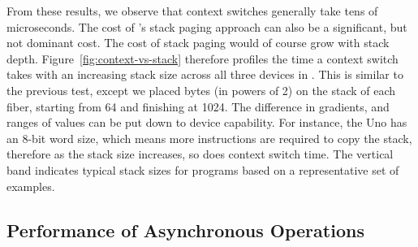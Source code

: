 From these results, we observe that context switches generally take tens of microseconds. The cost of \CON's stack paging approach can also be a significant, but not dominant cost. The cost of stack paging would of course grow with stack depth. Figure~\ref{fig:context-vs-stack} therefore profiles the time a context switch takes with an increasing stack size across all three devices in \CON. This is similar to the previous test, except we placed bytes (in powers of 2) on the stack of each fiber, starting from 64 and finishing at 1024. The difference in gradients, and ranges of values can be put down to device capability. For instance, the Uno has an 8-bit word size, which means more instructions are required to copy the stack, therefore as the stack size increases, so does context switch time. The vertical band indicates typical stack sizes for \MC programs based on a representative set of examples.


\subsection{Performance of Asynchronous Operations}


